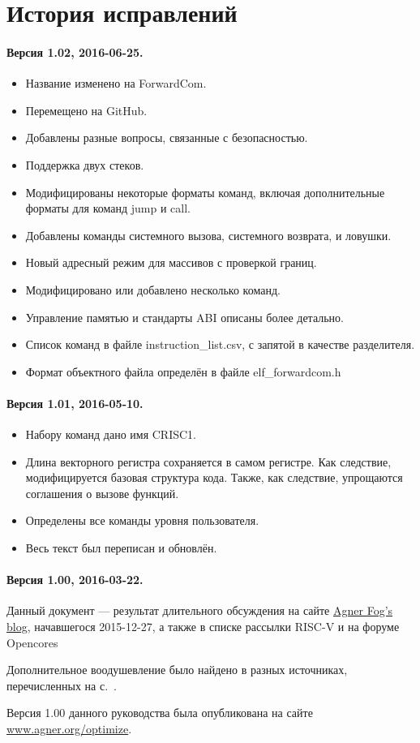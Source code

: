 \documentclass[forwardcom.tex]{subfiles}
\begin{document}
\chapter{История исправлений}
\subsubsection{Версия 1.02, 2016-06-25.}
\begin{itemize}
\item Название изменено на ForwardCom.	
\item Перемещено на GitHub.
\item Добавлены разные вопросы, связанные с безопасностью.
\item Поддержка двух стеков.
\item Модифицированы некоторые форматы команд, включая дополнительные форматы для команд jump и call.
\item Добавлены команды системного вызова, системного возврата, и ловушки.
\item Новый адресный режим для массивов с проверкой границ.
\item Модифицировано или добавлено несколько команд.
\item Управление памятью и стандарты ABI описаны более детально.
\item Список команд в файле instruction\_list.csv, с запятой в качестве разделителя.
\item Формат объектного файла определён в файле elf\_forwardcom.h
\end{itemize}

\subsubsection{Версия 1.01, 2016-05-10.}
\begin{itemize}
\item Набору команд дано имя CRISC1.
\item Длина векторного регистра сохраняется в самом регистре. Как следствие, модифицируется базовая структура кода. Также, как следствие, упрощаются соглашения о вызове функций.
\item Определены все команды уровня пользователя.
\item Весь текст был переписан и обновлён.
\end{itemize}

\subsubsection{Версия 1.00, 2016-03-22.}
Данный документ --- результат длительного обсуждения на сайте \href{http://www.agner.org/optimize/blog/read.php?i=421}{Agner Fog's blog}, начавшегося  2015-12-27, а также в списке рассылки RISC-V и на форуме Opencores

Дополнительное воодушевление было найдено в разных источниках, перечисленных на с.~\pageref{referencesToIntroduction}. 

Версия 1.00 данного руководства была опубликована на сайте \href{http://www.agner.org/optimize}{www.agner.org/optimize}.
\end{document}

